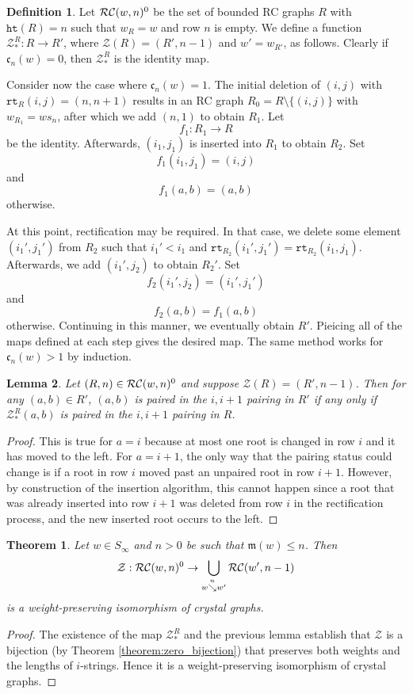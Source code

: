 \documentclass{amsart}
\newtheorem{lemma}{Lemma}[subsection]
\newtheorem{theorem}{Theorem}[section]
\theoremstyle{definition}
\newtheorem{definition}[lemma]{Definition}
\theoremstyle{remark}
\numberwithin{equation}{subsection}
\newcommand{\downvar}[1]{\stackrel{#1}{\searrow}}
\newcommand{\wof}[1]{w_{#1}}
\newcommand{\rtt}{\mathtt{rt}}
\newcommand{\zeromap}{\mathcal{Z}}
\newcommand{\hr}{\mathtt{ht}}
\newcommand{\code}{\mathfrak{c}}
\newcommand{\maxd}{\mathfrak{m}}
\begin{document}
\begin{definition}
Let $\mathcal{RC}(w, n)^0$ be the set of bounded RC graphs $R$ with $\hr(R)=n$ such that $\wof{R} = w$ and row $n$ is empty. We define a function $\zeromap_*^R:R\to R'$, where $\zeromap(R) = (R',n-1)$ and $w'=\wof{R'}$, as follows. Clearly if $\code_n(w) = 0$, then $\zeromap_*^R$ is the identity map. 

Consider now the case where $\code_n(w) = 1$. The initial deletion of $(i,j)$ with $\rtt_R(i,j) = (n, n+1)$ results in an RC graph $R_0 = R\setminus\{(i,j)\}$ with $\wof{R_1} = w s_n$, after which we add $(n,1)$ to obtain $R_1$. Let
$$f_1:R_1\to R$$
be the identity. Afterwards, $(i_1, j_1)$ is inserted into $R_1$ to obtain $R_2$. Set
$$f_1(i_1,j_1) = (i,j)$$
and
$$f_1(a,b) = (a,b)$$
otherwise.

At this point, rectification may be required. In that case, we delete some element $(i_1', j_1')$ from $R_2$ such that $i_1'<i_1$ and $\rtt_{R_2}(i_1', j_1') = \rtt_{R_2}(i_1, j_1)$. Afterwards, we add $(i_1', j_2)$ to obtain $R_2'$. Set
$$f_2(i_1', j_2) = (i_1', j_1')$$
and
$$f_2(a,b) = f_1(a,b)$$
otherwise. Continuing in this manner, we eventually obtain $R'$. Pieicing all of the maps defined at each step gives the desired map. The same method works for $\code_n(w) > 1$ by induction.
\end{definition}

\begin{lemma} \label{lemma:crystalpair}
Let $(R, n)\in \mathcal{RC}(w, n)^0$ and suppose $\zeromap(R) = (R', n-1)$. Then for any $(a,b)\in R'$, $(a,b)$ is paired in the $i,i+1$ pairing in $R'$ if any only if $\zeromap_*^R(a,b)$ is paired in the $i,i+1$ pairing in $R$.
\end{lemma}
\begin{proof}
  This is true for $a=i$ because at most one root is changed in row $i$ and it has moved to the left. For $a=i+1$, the only way that the pairing status could change is if a root in row $i$ moved past an unpaired root in row $i+1$. However, by construction of the insertion algorithm, this cannot happen since a root that was already inserted into row $i+1$ was deleted from row $i$ in the rectification process, and the new inserted root occurs to the left.
\end{proof}

\begin{theorem} \label{theorem:zcrystal}
	Let $w\in S_\infty$ and $n>0$ be such that $\maxd(w)\leq n$. Then 
	$$\zeromap:\RC(w, n)^0\to \bigcup_{w\downvar{n} w'}\RC(w', n-1)$$ 
	is a weight-preserving isomorphism of crystal graphs.
\end{theorem}
\begin{proof}
The existence of the map $\zeromap_*^R$ and the previous lemma establish that $\zeromap$ is a bijection (by Theorem \ref{theorem:zero_bijection}) that preserves both weights and the lengths of $i$-strings. Hence it is a weight-preserving isomorphism of crystal graphs.
\end{proof}
\end{document}

